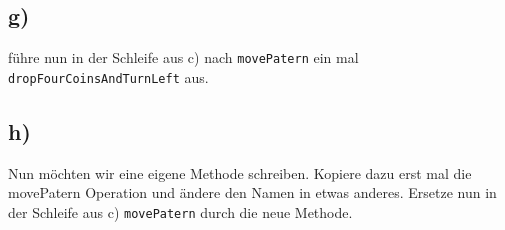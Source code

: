 \subsection*{g)}
führe nun in der Schleife aus c) nach \lstinline{movePatern} ein mal \lstinline{dropFourCoinsAndTurnLeft} aus.
\subsection*{h)}
Nun möchten wir eine eigene Methode schreiben. Kopiere dazu erst mal die movePatern Operation und ändere den Namen in etwas anderes.
Ersetze nun in der Schleife aus c) \lstinline{movePatern} durch die neue Methode.
